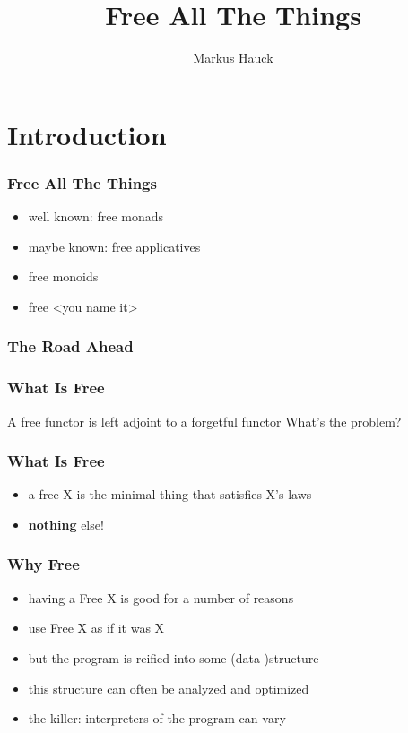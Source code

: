 \documentclass{beamer}
\title{Free All The Things}
\author{Markus Hauck}
\begin{document}
\begin{frame}
  \titlepage{}
\end{frame}

\section{Introduction}\label{sec:introduction}

\begin{frame}
\frametitle{Free All The Things}
\begin{itemize}
\item well known: free monads
\item maybe known: free applicatives
\item free monoids
\item free <you name it>
\end{itemize}
\end{frame}

\begin{frame}
  \frametitle{The Road Ahead}
\end{frame}

\begin{frame}
  \frametitle{What Is Free}
  A free functor is left adjoint to a forgetful functor
  What's the problem?
\end{frame}

\begin{frame}
  \frametitle{What Is Free}
  \begin{itemize}
  \item a free X is the minimal thing that satisfies X's laws
  \item \textbf{nothing} else!

  \end{itemize}
\end{frame}

\begin{frame}
  \frametitle{Why Free}
  \begin{itemize}
  \item having a Free X is good for a number of reasons
  \item use Free X as if it was X
  \item but the program is reified into some (data-)structure
  \item this structure can often be analyzed and optimized
  \item the killer: interpreters of the program can vary
  \end{itemize}
\end{frame}
\end{document}
